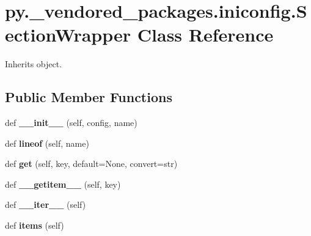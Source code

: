 \hypertarget{classpy_1_1__vendored__packages_1_1iniconfig_1_1_section_wrapper}{}\section{py.\+\_\+vendored\+\_\+packages.\+iniconfig.\+Section\+Wrapper Class Reference}
\label{classpy_1_1__vendored__packages_1_1iniconfig_1_1_section_wrapper}


Inherits object.

\subsection*{Public Member Functions}
\begin{DoxyCompactItemize}
\item 
\mbox{\label{classpy_1_1__vendored__packages_1_1iniconfig_1_1_section_wrapper_a7bce676e1f02f55bcec523236c2e42b4}} 
def {\bfseries \+\_\+\+\_\+init\+\_\+\+\_\+} (self, config, name)
\item 
\mbox{\label{classpy_1_1__vendored__packages_1_1iniconfig_1_1_section_wrapper_a514ee8330f067c8945fafd5d9228249d}} 
def {\bfseries lineof} (self, name)
\item 
\mbox{\label{classpy_1_1__vendored__packages_1_1iniconfig_1_1_section_wrapper_add8b8235d58698616bffc26468084b6d}} 
def {\bfseries get} (self, key, default=None, convert=str)
\item 
\mbox{\label{classpy_1_1__vendored__packages_1_1iniconfig_1_1_section_wrapper_a61a22158672f3091e0b3b31eb57a97d8}} 
def {\bfseries \+\_\+\+\_\+getitem\+\_\+\+\_\+} (self, key)
\item 
\mbox{\label{classpy_1_1__vendored__packages_1_1iniconfig_1_1_section_wrapper_a5338afb8322b7967456f458f277f86c5}} 
def {\bfseries \+\_\+\+\_\+iter\+\_\+\+\_\+} (self)
\item 
\mbox{\label{classpy_1_1__vendored__packages_1_1iniconfig_1_1_section_wrapper_a34efaec34bb22e4adfbd534c19b95251}} 
def {\bfseries items} (self)
\end{DoxyCompactItemize}
